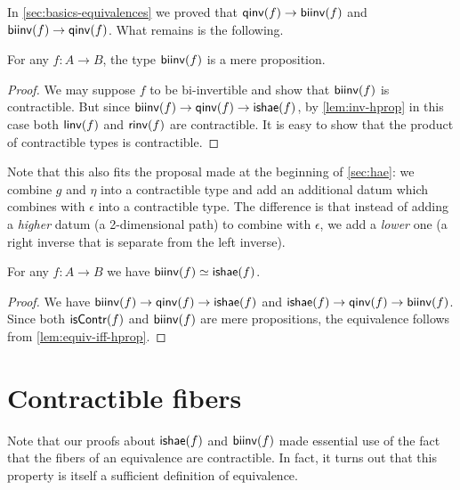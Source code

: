 In \autoref{sec:basics-equivalences} we proved that $\mathsf{qinv}(f)\to\mathsf{biinv}(f)$ and $\mathsf{biinv}(f)\to\mathsf{qinv}(f)$.
What remains is the following.

\begin{thm}\label{thm:isprop-biinv}
  For any $f:A\to B$, the type $\mathsf{biinv}(f)$ is a mere proposition.
\end{thm}
\begin{proof}
  We may suppose $f$ to be bi-invertible and show that $\mathsf{biinv}(f)$ is contractible.
  But since $\mathsf{biinv}(f)\to\mathsf{qinv}(f) \to \mathsf{ishae}(f)$, by \autoref{lem:inv-hprop} in this case both $\mathsf{linv}(f)$ and $\mathsf{rinv}(f)$ are contractible.
  It is easy to show that the product of contractible types is contractible.
\end{proof}

Note that this also fits the proposal made at the beginning of \autoref{sec:hae}: we combine $g$ and $\eta$ into a contractible type and add an additional datum which combines with $\epsilon$ into a contractible type.
The difference is that instead of adding a \emph{higher} datum (a 2-dimensional path) to combine with $\epsilon$, we add a \emph{lower} one (a right inverse that is separate from the left inverse).

\begin{cor}\label{thm:equiv-biinv-isequiv}
  For any $f:A\to B$ we have $\mathsf{biinv}(f) \simeq \mathsf{ishae}(f)$.
\end{cor}
\begin{proof}
  We have $\mathsf{biinv}(f) \to \mathsf{qinv}(f) \to \mathsf{ishae}(f)$ and $\mathsf{ishae}(f) \to \mathsf{qinv}(f) \to \mathsf{biinv}(f)$.
  Since both $\mathsf{isContr}(f)$ and $\mathsf{biinv}(f)$ are mere propositions, the equivalence follows from \autoref{lem:equiv-iff-hprop}.
\end{proof}

%
%
%

\section{Contractible fibers}
\label{sec:contrf}

%
%
%

Note that our proofs about $\mathsf{ishae}(f)$ and $\mathsf{biinv}(f)$ made essential use of the fact that the fibers of an equivalence are contractible.
In fact, it turns out that this property is itself a sufficient definition of equivalence.

